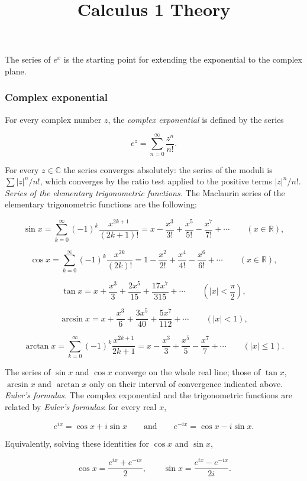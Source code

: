 \documentclass[11pt,a4paper]{article} \usepackage[T1]{fontenc}
\theoremstyle{plain} \newtheorem{theorem}{Theorem} \title{Calculus 1 Theory}
\begin{document}
The series of $e^x$ is the starting point for extending the exponential to the
complex plane.

\subsubsection {Complex exponential}

\begin{definition}
 For every complex number $z$, the \emph{complex
exponential} is defined by the series

\[
e^z = \sum_{n=0}^{\infty} \frac{z^n}{n!}.
\]

\end{definition}

For every $z\in\mathbb{C}$ the series converges absolutely: the series of the
moduli is $\sum |z|^n/n!$, which converges by the ratio test applied to the
positive terms $|z|^n/n!$. \emph{Series of the elementary trigonometric
functions.} The Maclaurin series of the elementary trigonometric functions are
the following:

\[
\sin x = \sum_{k=0}^{\infty} (-1)^k \frac{x^{2k+1}}{(2k+1)!} = x - \frac{x^3}{3!} + \frac{x^5}{5!} - \frac{x^7}{7!} + \cdots \qquad (x\in\mathbb{R}),
\]

\[
\cos x = \sum_{k=0}^{\infty} (-1)^k \frac{x^{2k}}{(2k)!} = 1 - \frac{x^2}{2!} + \frac{x^4}{4!} - \frac{x^6}{6!} + \cdots \qquad (x\in\mathbb{R}),
\]

\[
\tan x = x + \frac{x^3}{3} + \frac{2x^5}{15} + \frac{17x^7}{315} + \cdots \qquad \left(|x| < \frac{\pi}{2}\right),
\]

\[
\arcsin x = x + \frac{x^3}{6} + \frac{3x^5}{40} + \frac{5x^7}{112} + \cdots \qquad (|x| < 1),
\]

\[
\arctan x = \sum_{k=0}^{\infty} (-1)^k \frac{x^{2k+1}}{2k+1} = x - \frac{x^3}{3} + \frac{x^5}{5} - \frac{x^7}{7} + \cdots \qquad (|x| \le 1).
\]

The series of $\sin x$ and $\cos x$ converge on the whole real line; those of
$\tan x$, $\arcsin x$ and $\arctan x$ only on their interval of convergence
indicated above. \emph{Euler's formulas.} The complex exponential and the
trigonometric functions are related by \emph{Euler's formulas}: for every real
$x$,

\[
e^{ix} = \cos x + i\sin x \qquad\text{and}\qquad e^{-ix} = \cos x - i\sin x.
\]

Equivalently, solving these identities for $\cos x$ and $\sin x$,

\[
\cos x = \frac{e^{ix} + e^{-ix}}{2}, \qquad \sin x = \frac{e^{ix} - e^{-ix}}{2i}.
\]
\end{document}

